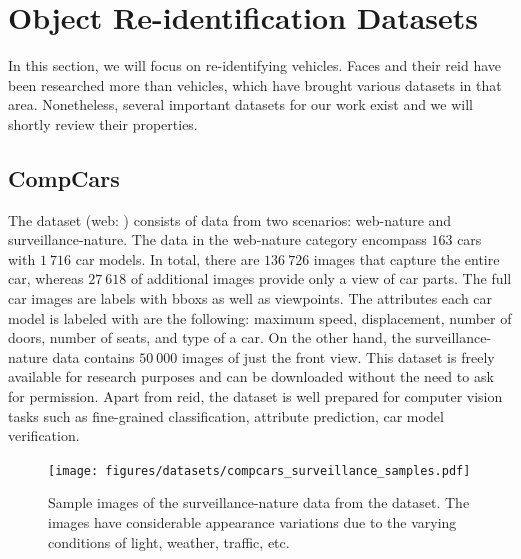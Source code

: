 \section{Object Re-identification Datasets}
\label{sec:ObjectReIDDatasets}

In this section, we will focus on re-identifying vehicles. Faces and their \gls{reid} have been researched more than vehicles, which have brought various datasets in that area. Nonetheless, several important datasets for our work exist and we will shortly review their properties. 

\subsection{CompCars}
\label{ssec:DatasetCompCars}

The  dataset \cite{Yang2015} (web: \cite{compcarsdataset}) consists of data from two scenarios: web-nature and surveillance-nature. The data in the web-nature category encompass $163$ cars with $1\ 716$ car models. In total, there are $136\ 726$ images that capture the entire car, whereas $27\ 618$ of additional images provide only a view of car parts. The full car images are labels with \glspl{bbox} as well as viewpoints. The attributes each car model is labeled with are the following: maximum speed, displacement, number of doors, number of seats, and type of a car. On the other hand, the surveillance-nature data contains $50\ 000$ images of just the front view. This dataset is freely available for research purposes and can be downloaded without the need to ask for permission. Apart from \gls{reid}, the dataset is well prepared for computer vision tasks such as fine-grained classification, attribute prediction, car model verification.

\begin{figure}[t]
    \centerline{\texttt{[image: figures/datasets/compcars\_surveillance\_samples.pdf]}}
    \caption[ dataset]{Sample images of the surveillance-nature data from the  dataset. The images have considerable appearance variations due to the varying conditions of light, weather, traffic, etc. }
    \label{fig:DatasetCompCarsSurveillance}
\end{figure}

